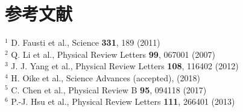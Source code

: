 \documentclass[11pt,a4paper]{jsarticle}
\begin{document}
\section*{参考文献}
\noindent
$^1$ D. Fausti et al., Science {\bf 331}, 189 (2011)\\
$^2$ Q. Li et al.,  Physical Review Letters {\bf99}, 067001 (2007)\\
$^3$ J. J. Yang et al., Physical Review Letters {\bf 108}, 116402 (2012)\\
$^4$ H. Oike et al., Science Advances (accepted), (2018)\\
$^5$ C. Chen et al., Physical Review B {\bf 95}, 094118 (2017)\\
$^6$ P.-J. Hsu et al., Physical Review Letters {\bf 111}, 266401 (2013)\\
\end{document}
